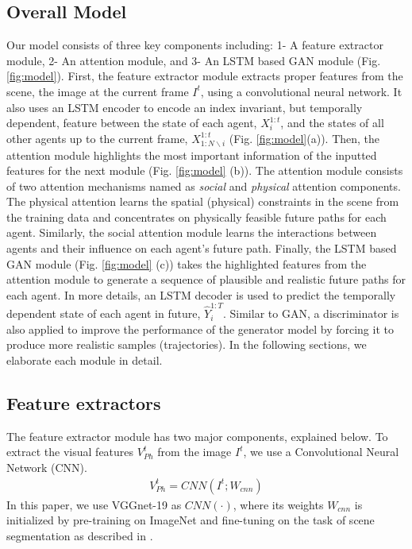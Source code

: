 \documentclass[10pt,twocolumn,letterpaper]{article}
\begin{document}
\subsection{Overall Model}
\label{sec:Overall_Model}
Our model consists of three key components including: 1- A feature extractor module, 2- An attention module, and 3- An LSTM based GAN module (Fig. \ref{fig:model}). First, the feature extractor module extracts proper features from the scene, \ie the image at the current frame $I^t$, using a convolutional neural network. It also uses an LSTM encoder to encode an index invariant, but temporally dependent, feature between the state of each agent, $X^{1:t}_{i}$, and the states of all other agents up to the current frame, $X^{1:t}_{1:N\backslash i}$ (Fig. \ref{fig:model}(a)). Then, the attention module highlights the most important information of the inputted features for the next module (Fig. \ref{fig:model} (b)). The attention module consists of two attention mechanisms named as \emph{social} and \emph{physical} attention components. The physical attention learns the spatial (physical) constraints in the scene from the training data and concentrates on physically feasible future paths for each agent. Similarly, the social attention module learns the interactions between agents and their influence on each agent's future path. Finally, the LSTM based GAN module (Fig. \ref{fig:model} (c)) takes the highlighted features from the attention module to generate a sequence of plausible and realistic future paths for each agent. In more details, an LSTM decoder is used to predict the temporally dependent state of each agent in future, \ie $\hat{Y}^{1:T}_i$. Similar to GAN, a discriminator is also applied to improve the performance of the generator model by forcing it to produce more realistic samples (trajectories). In the following sections, we elaborate each module in detail.

\subsection{Feature extractors}

The feature extractor module has two major components, explained below.
To extract the visual features $V^t_{Ph}$ from the image $I^t$, we use a Convolutional Neural Network (CNN).
\begin{eqnarray}
\label{eq:Feature_extractors1}
V^t_{Ph} = CNN(I^t ; W_{cnn}) 
\end{eqnarray}
In this paper, we use VGGnet-19 \cite{simonyan2014very} as $CNN(\cdot)$, where its weights $W_{cnn}$ is initialized by pre-training on ImageNet \cite{russakovsky2015imagenet} and fine-tuning on the task of scene segmentation as described in \cite{long2015fully}.
\end{document}
